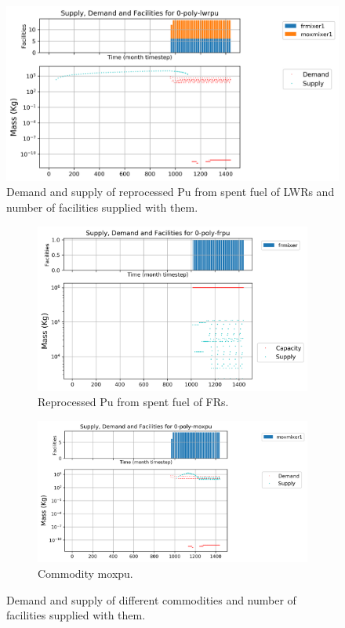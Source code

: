 \documentclass[11pt]{article}
\begin{document}
\begin{figure}[H]
	\centering
	\includegraphics[width=\textwidth]{29-figures/0-poly-lwrpu.png} 
	\hfill
	\caption{Demand and supply of reprocessed Pu from spent fuel of LWRs and number of facilities supplied with them.}
	\label{fig:29-pu1}
\end{figure}

\begin{figure}[H]
	\centering
	\begin{subfigure}[t]{0.45\textwidth}
		\centering
		\includegraphics[width=\linewidth]{23-figures/0-poly-frpu.png} 
		\caption{Reprocessed Pu from spent fuel of FRs.}
		\label{fig:29-frpu}
	\end{subfigure}
	\vspace{1cm}
	\begin{subfigure}[t]{0.45\textwidth}
		\centering
		\includegraphics[width=\linewidth]{29-figures/0-poly-moxpu.png} 
		\caption{Commodity moxpu.}
		\label{fig:29-moxpu}
	\end{subfigure}
	\hfill
	\caption{Demand and supply of different commodities and number of facilities supplied with them.}
	\label{fig:29-pu2}
\end{figure}
\end{document}
